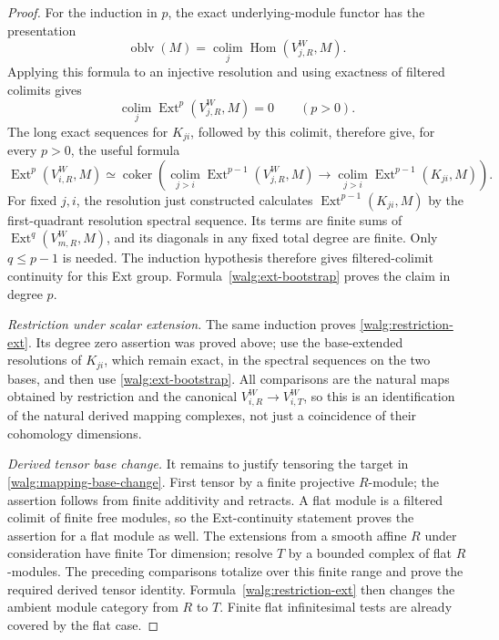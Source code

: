 \documentclass[11pt]{article}
\numberwithin{equation}{section}
\theoremstyle{definition}
\theoremstyle{remark}
\begin{document}
\begin{proof}
For the induction in \(p\), the exact underlying-module functor has
the presentation
\[
 \operatorname{oblv}(M)=
 \underset{j}{\operatorname{colim}}
       \operatorname{Hom}(V_{j,R}^W,M).
\]
Applying this formula to an injective resolution and using exactness
of filtered colimits gives
\[
 \underset{j}{\operatorname{colim}}
       \operatorname{Ext}^p(V_{j,R}^W,M)=0\qquad(p>0).
\]
The long exact sequences for \(K_{ji}\), followed by this colimit,
therefore give, for every \(p>0\), the useful formula
\begin{equation}\label{walg:ext-bootstrap}
 \operatorname{Ext}^p(V_{i,R}^W,M)
 \simeq\operatorname{coker}\left(
 \underset{j>i}{\operatorname{colim}}
       \operatorname{Ext}^{p-1}(V_{j,R}^W,M)
 \longrightarrow
 \underset{j>i}{\operatorname{colim}}
       \operatorname{Ext}^{p-1}(K_{ji},M)\right).
\end{equation}
For fixed \(j,i\), the resolution just constructed calculates
\(\operatorname{Ext}^{p-1}(K_{ji},M)\) by the first-quadrant
resolution spectral sequence.  Its terms are finite sums of
\(\operatorname{Ext}^q(V_{m,R}^W,M)\), and its diagonals in any
fixed total degree are finite.  Only \(q\leq p-1\) is needed.
The induction hypothesis therefore gives filtered-colimit continuity
for this Ext group.  Formula~\eqref{walg:ext-bootstrap} proves the
claim in degree \(p\).

\smallskip
\noindent\emph{Restriction under scalar extension.}
The same induction proves \eqref{walg:restriction-ext}.  Its degree
zero assertion was proved above; use the base-extended resolutions
of \(K_{ji}\), which remain exact, in the spectral sequences on the
two bases, and then use \eqref{walg:ext-bootstrap}.  All comparisons
are the natural maps obtained by restriction and the canonical
\(V_{i,R}^W\to V_{i,T}^W\), so this is an identification of the
natural derived mapping complexes, not just a coincidence of their
cohomology dimensions.

\smallskip
\noindent\emph{Derived tensor base change.}
It remains to justify tensoring the target in
\eqref{walg:mapping-base-change}.  First tensor by a finite projective
\(R\)-module; the assertion follows from finite additivity and
retracts.  A flat module is a filtered colimit of finite free modules,
so the Ext-continuity statement proves the assertion for a flat
module as well.  The extensions from a smooth affine \(R\) under
consideration have finite Tor dimension; resolve \(T\) by a bounded
complex of flat \(R\)-modules.  The preceding comparisons totalize
over this finite range and prove the required derived tensor
identity.  Formula~\eqref{walg:restriction-ext} then changes the
ambient module category from \(R\) to \(T\).  Finite flat
infinitesimal tests are already covered by the flat case.
\end{proof}
\end{document}

